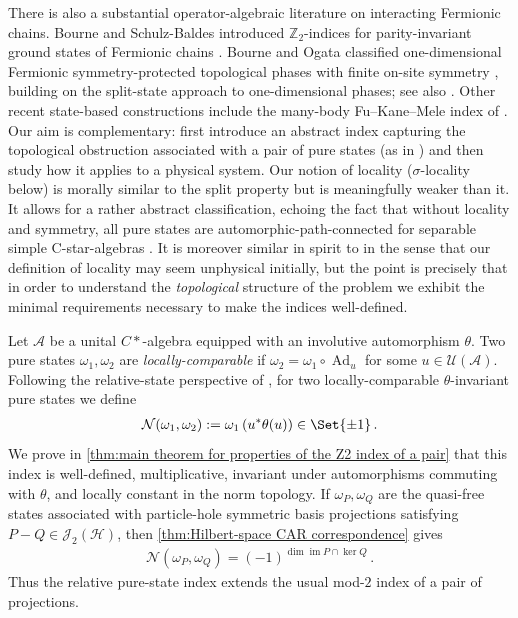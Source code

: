 \documentclass[a4paper,10pt]{article}
\numberwithin{equation}{section}
\theoremstyle{plain}
\theoremstyle{plain}
\theoremstyle{plain}
\theoremstyle{plain}
\theoremstyle{plain}
\theoremstyle{remark}
\theoremstyle{definition}
\newcommand{\ZZ}{\mathbb{Z}}
\newcommand{\calA}{\mathcal{A}}
\newcommand{\calN}{\mathcal{N}}
\newcommand{\calU}{\mathcal{U}}
\newcommand{\calH}{\mathcal{H}}
\newcommand{\calJ}{\mathcal{J}}
\newcommand{\Ad}[1]{\operatorname{Ad}_{#1}}
\newcommand{\im}{\operatorname{im}}
\newcommand{\eq}[1]{\begin{align*}#1\end{align*}}
\newcommand{\br}[1]{\left(#1\right)}
\newcommand{\Cstar}{C*}
\begin{document}
There is also a substantial operator-algebraic literature on interacting Fermionic chains. Bourne and Schulz-Baldes introduced $\ZZ_2$-indices for parity-invariant ground states of Fermionic chains \cite{BourneSchulzBaldes2020Z2}. Bourne and Ogata classified one-dimensional Fermionic symmetry-protected topological phases with finite on-site symmetry \cite{BourneOgata2021FermionSPT}, building on the split-state approach to one-dimensional phases; see also \cite{Matsui2013Split,Ogata2021PureStates}. Other recent state-based constructions include the many-body Fu--Kane--Mele index of \cite{BachmannBolsRahnama2024ManyBodyFKM}. Our aim is complementary: first introduce an abstract index capturing the topological obstruction associated with a pair of pure states (as in \cite{BachmannShapiroTauber2026}) and then study how it applies to a physical system. Our notion of locality ($\sigma$-locality below) is morally similar to the split property but is meaningfully weaker than it. It allows for a rather abstract classification, echoing the fact that without locality and symmetry, all pure states are automorphic-path-connected for separable simple C-star-algebras  \cite{KishimotoOzawaSakai2003Homogeneity}. It is moreover similar in spirit to \cite{ChungShapiro2023} in the sense that our definition of locality may seem unphysical initially, but the point is precisely that in order to understand the \emph{topological} structure of the problem we exhibit the minimal requirements necessary to make the indices well-defined. 

Let $\calA$ be a unital $\Cstar$-algebra equipped with an involutive automorphism $\theta$. Two pure states $\omega_1,\omega_2$ are \emph{locally-comparable} if
$\omega_2=\omega_1\circ\Ad{u}$
for some $u\in\calU(\calA)$. Following the relative-state perspective of \cite{BachmannShapiroTauber2026}, for two locally-comparable $\theta$-invariant pure states we define
\eq{
    \calN(\omega_1,\omega_2)
    :=
    \omega_1\br{u^\ast\theta(u)}
    \in\Set{\pm1}\,.
}
We prove in \cref{thm:main theorem for properties of the Z2 index of a pair} that this index is well-defined, multiplicative, invariant under automorphisms commuting with $\theta$, and locally constant in the norm topology. If $\omega_P,\omega_Q$ are the quasi-free states associated with particle-hole symmetric basis projections satisfying
$P-Q\in\calJ_2(\calH)$, then \cref{thm:Hilbert-space CAR correspondence} gives
\eq{
    \calN(\omega_P,\omega_Q)
    =
    \br{-1}^{\dim\im P\cap\ker Q}\,.
}
Thus the relative pure-state index extends the usual mod-$2$ index of a pair of projections. 
\end{document}
